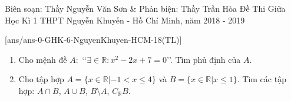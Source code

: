 \begin{name}
{Biên soạn: Thầy Nguyễn Văn Sơn \& Phản biện: Thầy Trần Hòa }
{Đề Thi Giữa Học Kì 1 THPT Nguyễn Khuyến - Hồ Chí Minh, năm 2018 - 2019}
\end{name}
\setcounter{ex}{0}\setcounter{bt}{0}
[ans/ans-0-GHK-6-NguyenKhuyen-HCM-18(TL)]
\begin{bt}%
\begin{enumerate}
\item Cho mệnh đề $A:$ \lq \lq $\exists \in \mathbb{R} \colon x^2-2x+7=0$\rq \rq. Tìm phủ định của $A$.
\item Cho tập hợp $A=\{ x\in \mathbb{R} | -1 < x \le 4 \}$ và $B=\{ x\in \mathbb{R} | x \le 1 \}.$
Tìm các tập hợp: $A \cap B$, $A \cup B$, $B \setminus A$, $C_{\mathbb{R}}B.$
\end{enumerate}
\loigiai{
\begin{enumerate}
\item Ta có $\overline{A}:$ \lq \lq$\forall x \in \mathbb{R}:x^2-2x+7\ne 0$\rq \rq.
\item Ta có $A=\left(-1;4\right]$  và $B=\left(- \infty;1 \right]$ nên:\\
$A \cap B = \left(-1;1 \right].$\\
$A \cup B = \left(- \infty; 4 \right].$\\
$B \setminus A = \left(- \infty; -1 \right].$\\
$C_{\mathbb{R}}B = \left(1; + \infty \right).$
\end{enumerate}
}
\end{bt}
